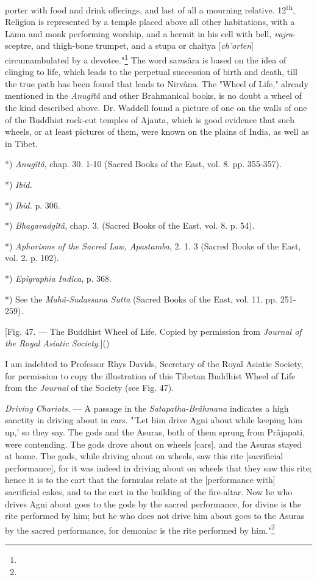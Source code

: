 \documentclass[a4paper, 11pt, oneside, polutonikogreek, english]{article}
\begin{document}
porter with food and drink offerings, and last of all a mourning relative. 12\textsuperscript{th}, Religion is represented by a temple placed above all other habitations, with a Lāma and monk performing worship, and a hermit in his cell with bell, \emph{vajra}-sceptre, and thigh-bone trumpet, and a stupa or chaitya [\emph{ch'orten}] circumambulated by a devotee."\footnote{} The word sa\emph{m}sâra is based on the idea of clinging to life, which leads to the perpetual succession of birth and death, till the true path has been found that leads to Nirvâna. The "Wheel of Life," already mentioned in the \emph{Anugîtâ} and other Brahmanical books, is no doubt a wheel of the kind described above. Dr. Waddell found a picture of one on the walls of one of the Buddhist rock-cut temples of Ajanta, which is good evidence that such wheels, or at least pictures of them, were known on the plains of India, as well as in Tibet.

*) \emph{Anugîtâ}, chap. 30. 1-10 (Sacred Books of the East, vol. 8. pp. 355-357).

*) \emph{Ibid.}

*) \emph{Ibid.} p. 306.

*) \emph{Bhagavadgîtâ}, chap. 3. (Sacred Books of the East, vol. 8. p. 54).

*) \emph{Aphorisms of the Sacred Law, Apastamba}, 2. 1. 3 (Sacred Books of the East, vol. 2. p. 102).

*) \emph{Epigraphia Indica}, p. 368.

*) See the \emph{Mahâ-Sudassana Sutta} (Sacred Books of the East, vol. 11. pp. 251-259).

[Fig. 47. --- The Buddhist Wheel of Life. Copied by permission from \emph{Journal of the Royal Asiatic Society}.]()

I am indebted to Professor Rhys Davids, Secretary of the Royal Asiatic Society, for permission to copy the illustration of this Tibetan Buddhist Wheel of Life from the \emph{Journal} of the Society (see Fig. 47).

\emph{Driving Chariots.} --- A passage in the \emph{Satapatha-Brâhmana} indicates a high sanctity in driving about in cars. "'Let him drive Agni about while keeping him up,' so they say. The gods and the Asuras, both of them sprung from Prâjapati, were contending. The gods drove about on wheels [cars], and the Asuras stayed at home. The gods, while driving about on wheels, saw this rite [sacrificial performance], for it was indeed in driving about on wheels that they saw this rite; hence it is to the cart that the formulas relate at the [performance with] sacrificial cakes, and to the cart in the building of the fire-altar. Now he who drives Agni about goes to the gods by the sacred performance, for divine is the rite performed by him; but he who does not drive him about goes to the Asuras by the sacred performance, for demoniac is the rite performed by him."\footnote{}
\end{document}
